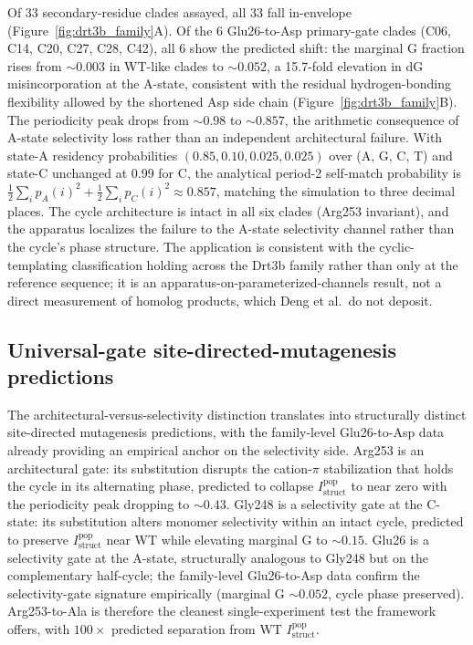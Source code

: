 \documentclass[aps,prx,reprint,amsmath,amssymb,floatfix,superscriptaddress,nofootinbib]{revtex4-2}
\theoremstyle{plain-thm}
\theoremstyle{definition-thm}
\newcommand{\Istructpop}{I_{\mathrm{struct}}^{\mathrm{pop}}}
\begin{document}
Of 33 secondary-residue clades assayed, all 33 fall in-envelope (Figure~\ref{fig:drt3b_family}A). Of the 6 Glu26-to-Asp primary-gate clades (C06, C14, C20, C27, C28, C42), all 6 show the predicted shift: the marginal G fraction rises from $\sim 0.003$ in WT-like clades to $\sim 0.052$, a 15.7-fold elevation in dG misincorporation at the A-state, consistent with the residual hydrogen-bonding flexibility allowed by the shortened Asp side chain (Figure~\ref{fig:drt3b_family}B). The periodicity peak drops from $\sim 0.98$ to $\sim 0.857$, the arithmetic consequence of A-state selectivity loss rather than an independent architectural failure. With state-A residency probabilities $(0.85, 0.10, 0.025, 0.025)$ over (A, G, C, T) and state-C unchanged at 0.99 for C, the analytical period-2 self-match probability is $\frac{1}{2}\sum_i p_A(i)^2 + \frac{1}{2}\sum_i p_C(i)^2 \approx 0.857$, matching the simulation to three decimal places. The cycle architecture is intact in all six clades (Arg253 invariant), and the apparatus localizes the failure to the A-state selectivity channel rather than the cycle's phase structure. The application is consistent with the cyclic-templating classification holding across the Drt3b family rather than only at the reference sequence; it is an apparatus-on-parameterized-channels result, not a direct measurement of homolog products, which Deng et al.\ do not deposit.

\subsection{Universal-gate site-directed-mutagenesis predictions}

The architectural-versus-selectivity distinction translates into structurally distinct site-directed mutagenesis predictions, with the family-level Glu26-to-Asp data already providing an empirical anchor on the selectivity side. Arg253 is an architectural gate: its substitution disrupts the cation-$\pi$ stabilization that holds the cycle in its alternating phase, predicted to collapse $\Istructpop$ to near zero with the periodicity peak dropping to $\sim 0.43$. Gly248 is a selectivity gate at the C-state: its substitution alters monomer selectivity within an intact cycle, predicted to preserve $\Istructpop$ near WT while elevating marginal G to $\sim 0.15$. Glu26 is a selectivity gate at the A-state, structurally analogous to Gly248 but on the complementary half-cycle; the family-level Glu26-to-Asp data confirm the selectivity-gate signature empirically (marginal G $\sim 0.052$, cycle phase preserved). Arg253-to-Ala is therefore the cleanest single-experiment test the framework offers, with $100\times$ predicted separation from WT $\Istructpop$.
\end{document}

